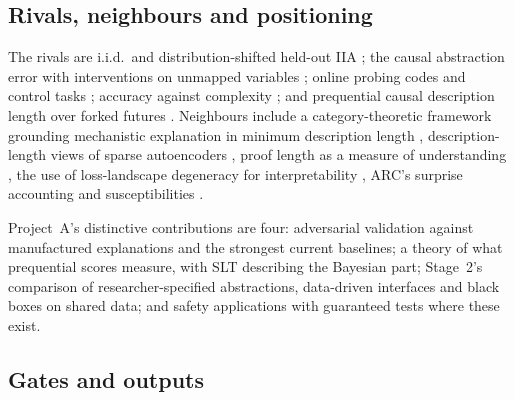 \documentclass[11pt,a4paper]{article}
\begin{document}
\subsection{Rivals, neighbours and positioning}

The rivals are i.i.d.\ and distribution-shifted held-out IIA
\cite{sutter2025}; the causal abstraction error with interventions on
unmapped variables \cite{meloux2026}; online probing codes \cite{voita2020}
and control tasks \cite{hewittliang2019}; accuracy against complexity
\cite{pimentel2020pareto}; and prequential causal description length over
forked futures \cite{ma2026}. Neighbours include a category-theoretic
framework grounding mechanistic explanation in minimum description length
\cite{gauderis2026}, description-length views of sparse autoencoders
\cite{ayonrinde2024}, proof length as a measure of understanding
\cite{gross2024}, the use of loss-landscape degeneracy for interpretability
\cite{bushnaq2024}, ARC's surprise accounting \cite{hilton2024} and
susceptibilities \cite{baker2026}.

Project~A's distinctive contributions are four: adversarial validation
against manufactured explanations and the strongest current baselines; a
theory of what prequential scores measure, with SLT describing the
Bayesian part; Stage~2's comparison of researcher-specified abstractions,
data-driven interfaces and black boxes on shared data; and safety
applications with guaranteed tests where these exist.

\subsection{Gates and outputs}
\label{sec:gatesA}
\end{document}
